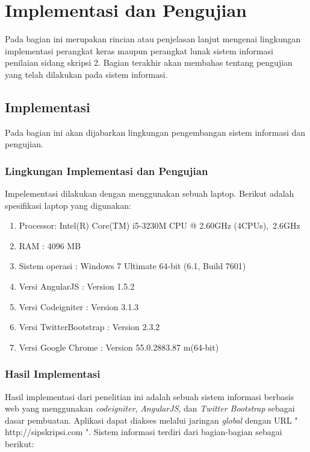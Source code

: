 \chapter{Implementasi dan Pengujian}
\label{chap: implemenPengujian}

Pada bagian ini merupakan rincian atau penjelasan lanjut mengenai lingkungan implementasi perangkat keras maupun perangkat lunak sistem informasi penilaian sidang skripsi 2. Bagian terakhir akan membahas tentang pengujian yang telah dilakukan pada sistem informasi.

\section{Implementasi}
\label{sec: implementasi}

	Pada bagian ini akan dijabarkan lingkungan pengembangan sistem informasi dan pengujian.
	
	\subsection{Lingkungan Implementasi dan Pengujian}
	\label{sub: lingkunganImp}
	
	Impelementasi dilakukan dengan menggunakan sebuah laptop. Berikut adalah spesifikasi laptop
	yang digunakan:
	
	\begin{enumerate}
		\item Processor: Intel(R) Core(TM) i5-3230M CPU @ 2.60GHz (4CPUs),~2.6GHz
		\item RAM : 4096 MB
		\item Sistem operasi : Windows 7 Ultimate 64-bit (6.1, Build 7601)
		\item Versi AngularJS : Version 1.5.2
		\item Versi Codeigniter : Version 3.1.3
		\item Versi TwitterBootstrap : Version 2.3.2
		\item Versi Google Chrome : Version 55.0.2883.87 m(64-bit)
	\end{enumerate}

	\subsection{Hasil Implementasi}
	\label{sub: hasilImplemen}
	
	Hasil implementasi dari penelitian ini adalah sebuah sistem informasi berbasis web yang menggunakan \textit{codeigniter}, \textit{AngularJS}, dan \textit{Twitter Bootstrap} sebagai dasar pembuatan. Aplikasi dapat diakses melalui jaringan \textit{global} dengan URL " http://sipskripsi.com ". Sistem informasi terdiri dari bagian-bagian sebagai berikut:
	

